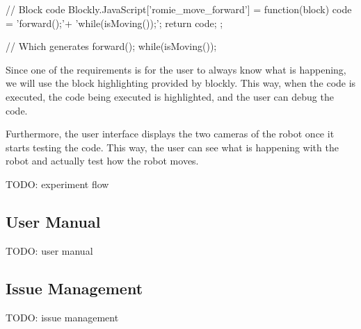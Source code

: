 \begin{center}
\begin{minipage}{.9\textwidth}
\singlespace
{}
\begin{pyglist}[language=javascript, caption={Generated code.},
	label={alg:generated}, listingname={Algorithm}, numbers=left]
// Block code
Blockly.JavaScript['romie_move_forward'] = function(block) {
    code = 'forward();\n'+
            'while(isMoving());\n';
    return code;
};

// Which generates
forward();
while(isMoving());
\end{pyglist}
\end{minipage}
\end{center}

Since one of the requirements is for the user to always know what is happening, we will use the
block highlighting provided by blockly. This way, when the code is executed, the code being executed
is highlighted, and the user can debug the code.

Furthermore, the user interface displays the two cameras of the robot once it starts testing the
code. This way, the user can see what is happening with the robot and actually test how the robot
moves.

TODO: experiment flow

\subsection{User Manual}

TODO: user manual

\subsection{Issue Management}

TODO: issue management
